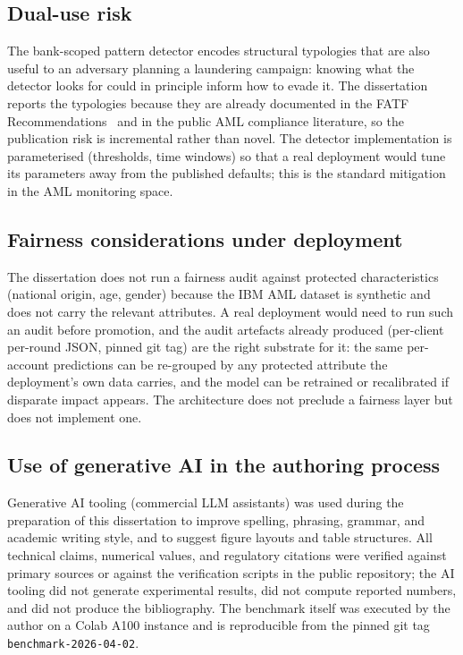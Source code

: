 \documentclass{report}
\begin{document}
\subsection{Dual-use risk}

The bank-scoped pattern detector encodes structural typologies that are also useful to an adversary planning a laundering campaign: knowing what the detector looks for could in principle inform how to evade it. The dissertation reports the typologies because they are already documented in the FATF Recommendations~\cite{fatf2025recommendations} and in the public AML compliance literature, so the publication risk is incremental rather than novel. The detector implementation is parameterised (thresholds, time windows) so that a real deployment would tune its parameters away from the published defaults; this is the standard mitigation in the AML monitoring space.

\subsection{Fairness considerations under deployment}

The dissertation does not run a fairness audit against protected characteristics (national origin, age, gender) because the IBM AML dataset is synthetic and does not carry the relevant attributes. A real deployment would need to run such an audit before promotion, and the audit artefacts already produced (per-client per-round JSON, pinned git tag) are the right substrate for it: the same per-account predictions can be re-grouped by any protected attribute the deployment's own data carries, and the model can be retrained or recalibrated if disparate impact appears. The architecture does not preclude a fairness layer but does not implement one.

\subsection{Use of generative AI in the authoring process}

Generative AI tooling (commercial LLM assistants) was used during the preparation of this dissertation to improve spelling, phrasing, grammar, and academic writing style, and to suggest figure layouts and table structures. All technical claims, numerical values, and regulatory citations were verified against primary sources or against the verification scripts in the public repository; the AI tooling did not generate experimental results, did not compute reported numbers, and did not produce the bibliography. The benchmark itself was executed by the author on a Colab A100 instance and is reproducible from the pinned git tag \texttt{benchmark-2026-04-02}.
\end{document}
